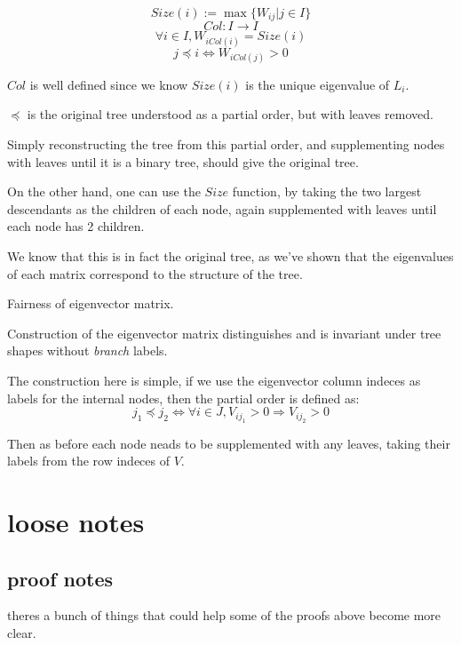 \documentclass[10pt,a4paper]{report}
\begin{document}
\[\mathit{Size}(i) := \max\{W_{ij} | j \in I\}\]
\[\mathit{Col}: I \rightarrow I\]
\[\forall i \in I, W_{i \mathit{Col}(i)} = \mathit{Size}(i)\]
\[j \preccurlyeq i \Leftrightarrow W_{i \mathit{Col}(j)} > 0\]

$\mathit{Col}$ is well defined since we know $\mathit{Size}(i)$ is the unique
eigenvalue of $L_i$.

$\preccurlyeq$ is the original tree understood as a partial order, but with
leaves removed.

Simply reconstructing the tree from this partial order, and supplementing nodes
with leaves until it is a binary tree, should give the original tree.

On the other hand, one can use the $\mathit{Size}$ function, by taking the two
largest descendants as the children of each node, again supplemented with
leaves until each node has 2 children.

We know that this is in fact the original tree, as we've shown that the
eigenvalues of each matrix correspond to the structure of the tree.

\begin{theorem-wip} Fairness of eigenvector matrix.

	Construction of the eigenvector matrix distinguishes and is invariant under tree shapes without \emph{branch} labels.
\end{theorem-wip}

The construction here is simple, if we use the eigenvector column indeces as
labels for the internal nodes, then the partial order is defined as:
\[j_1 \preccurlyeq j_2 \Leftrightarrow \forall i \in J, V_{ij_1} > 0
\Rightarrow V_{ij_2} > 0 \]

Then as before each node neads to be supplemented with any leaves, taking their
labels from the row indeces of $V$.

\chapter{loose notes}

\section{proof notes}

theres a bunch of things that could help some of the proofs above become more
clear.
\end{document}

